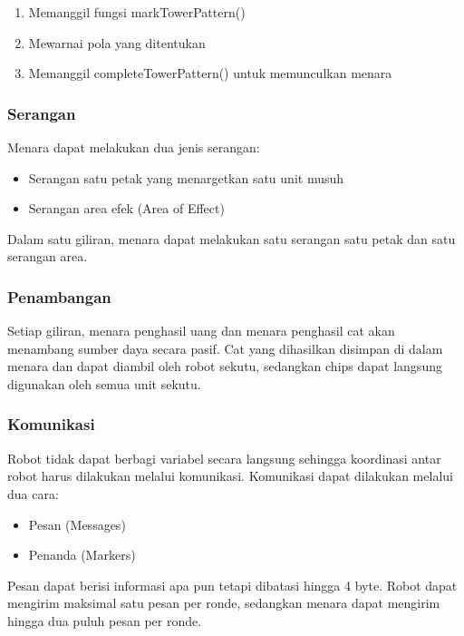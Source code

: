 \documentclass{article}
\begin{document}
\begin{enumerate}
\item Memanggil fungsi markTowerPattern()
\item Mewarnai pola yang ditentukan
\item Memanggil completeTowerPattern() untuk memunculkan menara
\end{enumerate}


\subsubsection{Serangan}

Menara dapat melakukan dua jenis serangan:  

\begin{itemize}
\item Serangan satu petak yang menargetkan satu unit musuh
\item Serangan area efek (Area of Effect)
\end{itemize}

Dalam satu giliran, menara dapat melakukan satu serangan satu petak dan satu serangan area. 


\subsubsection{Penambangan}

Setiap giliran, menara penghasil uang dan menara penghasil cat akan menambang sumber daya 
secara pasif.  
Cat yang dihasilkan disimpan di dalam menara dan dapat diambil oleh robot sekutu, sedangkan chips 
dapat langsung digunakan oleh semua unit sekutu. 


\subsubsection{Komunikasi}

Robot tidak dapat berbagi variabel secara langsung sehingga koordinasi antar robot harus dilakukan 
melalui komunikasi.  
Komunikasi dapat dilakukan melalui dua cara:  

\begin{itemize}
\item Pesan (Messages)
\item Penanda (Markers)
\end{itemize}

Pesan dapat berisi informasi apa pun tetapi dibatasi hingga 4 byte. Robot dapat mengirim maksimal 
satu pesan per ronde, sedangkan menara dapat mengirim hingga dua puluh pesan per ronde.  
\end{document}
